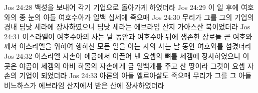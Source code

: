 Jos 24:28  백성을 보내어 각기 기업으로 돌아가게 하였더라
Jos 24:29  이 일 후에 여호와의 종 눈의 아들 여호수아가 일백 십세에 죽으매
Jos 24:30  무리가 그를 그의 기업의 경내 딤낫 세라에 장사하였으니 딤낫 세라는 에브라임 산지 가아스산 북이었더라
Jos 24:31  이스라엘이 여호수아의 사는 날 동안과 여호수아 뒤에 생존한 장로들 곧 여호와께서 이스라엘을 위하여 행하신 모든 일을 아는 자의 사는 날 동안 여호와를 섬겼더라
Jos 24:32  이스라엘 자손이 애굽에서 이끌어 낸 요셉의 뼈를 세겜에 장사하였으니 이 곳은 야곱이 세겜의 아비 하몰의 자손에게 금 일백개를 주고 산 땅이라 그것이 요셉 자손의 기업이 되었더라
Jos 24:33  아론의 아들 엘르아살도 죽으매 무리가 그를 그 아들 비느하스가 에브라임 산지에서 받은 산에 장사하였더라


